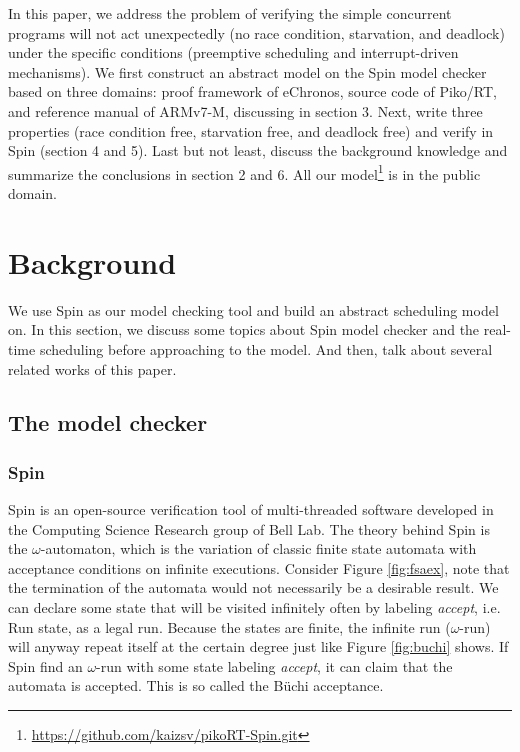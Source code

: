 In this paper, we address the problem of verifying the simple concurrent programs will not act unexpectedly (no race condition, starvation, and deadlock) under the specific conditions (preemptive scheduling and interrupt-driven mechanisms). We first construct an abstract model on the Spin model checker based on three domains: proof framework of eChronos, source code of Piko/RT, and reference manual of ARMv7-M, discussing in section 3. Next, write three properties (race condition free, starvation free, and deadlock free) and verify in Spin (section 4 and 5). Last but not least, discuss the background knowledge and summarize the conclusions in section 2 and 6. All our model\footnote{\url{https://github.com/kaizsv/pikoRT-Spin.git}} is in the public domain.

\section{Background}
We use Spin as our model checking tool and build an abstract scheduling model on. In this section, we discuss some topics about Spin model checker and the real-time scheduling before approaching to the model. And then, talk about several related works of this paper.

\subsection{The model checker}
\subsubsection{Spin}
Spin \cite{SpinRoot, Ben-Ari:2008:PSM:1349767, Holzmann:2003:SMC:1405716} is an open-source verification tool of multi-threaded software developed in the Computing Science Research group of Bell Lab. The theory behind Spin is the $\omega$-automaton, which is the variation of classic finite state automata with acceptance conditions on infinite executions. Consider Figure \ref{fig:fsaex}, note that the termination of the automata would not necessarily be a desirable result. We can declare some state that will be visited infinitely often by labeling \textit{accept}, i.e. Run state, as a legal run. Because the states are finite, the infinite run ($\omega$-run) will anyway repeat itself at the certain degree just like Figure \ref{fig:buchi} shows. If Spin find an $\omega$-run with some state labeling \textit{accept}, it can claim that the automata is accepted. This is so called the B\"uchi acceptance.

